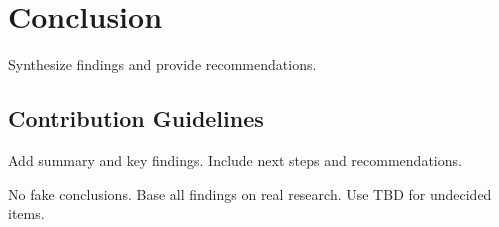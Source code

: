 \chapter{Conclusion}

Synthesize findings and provide recommendations.

\section{Contribution Guidelines}

Add summary and key findings. Include next steps and recommendations.

No fake conclusions. Base all findings on real research. Use TBD for undecided items.

